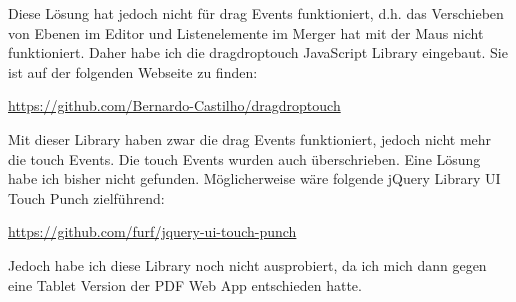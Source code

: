 Diese Lösung hat jedoch nicht für drag Events funktioniert, d.h. das Verschieben von Ebenen im Editor und Listenelemente im Merger hat mit der Maus nicht funktioniert. Daher habe ich die dragdroptouch JavaScript Library eingebaut. Sie ist auf der folgenden Webseite zu finden:

\url{https://github.com/Bernardo-Castilho/dragdroptouch}

Mit dieser Library haben zwar die drag Events funktioniert, jedoch nicht mehr die touch Events. Die touch Events wurden auch überschrieben. Eine Lösung habe ich bisher nicht gefunden. Möglicherweise wäre folgende jQuery Library UI Touch Punch zielführend:

\url{https://github.com/furf/jquery-ui-touch-punch}

Jedoch habe ich diese Library noch nicht ausprobiert, da ich mich dann gegen eine Tablet Version der PDF Web App entschieden hatte.


